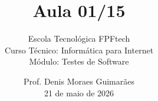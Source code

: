 
\title{Aula 01/15}

\subtitle{
\vspace{1.0cm}
Escola Tecnológica FPFtech\\
\vspace{0.5cm}
Curso Técnico: Informática para Internet\\
\vspace{0.5cm}
Módulo: Testes de Software
\vspace{1.0cm}
}

\author{
Prof. Denis Moraes Guimarães\\
\small 21 de maio de 2026
}

\date{}